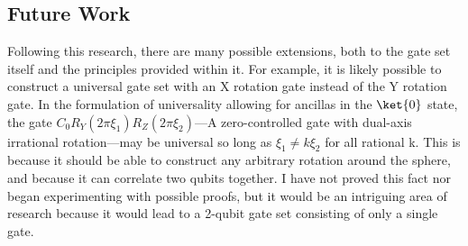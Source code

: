\documentclass[12pt]{article}
\begin{document}
\subsection{Future Work}
Following this research, there are many possible extensions, both to the gate set itself and the principles provided within it. For example, it is likely possible to construct a universal gate set with an X rotation gate instead of the Y rotation gate. In the formulation of universality allowing for ancillas in the $\ket{0}$ state, the gate $C_0R_Y(2\pi\xi_1)R_Z(2\pi\xi_2)$---A zero-controlled gate with dual-axis irrational rotation---may be universal so long as $\xi_1 \ne k \xi_2$ for all rational k. This is because it should be able to construct any arbitrary rotation around the sphere, and because it can correlate two qubits together. I have not proved this fact nor began experimenting with possible proofs, but it would be an intriguing area of research because it would lead to a 2-qubit gate set consisting of only a single gate.

\pagebreak
\nocite{Barenco1995, Nielsen2023}
\printbibliography
\end{document}
